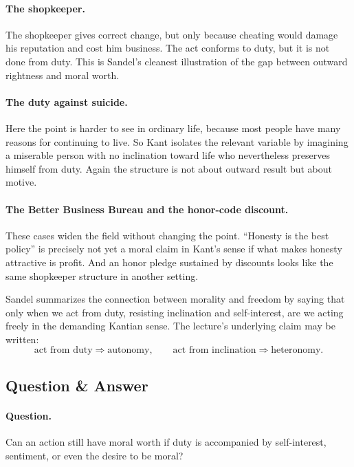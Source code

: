 \paragraph{The shopkeeper.} The shopkeeper gives correct change, but only because cheating would damage his reputation and cost him business. The act conforms to duty, but it is not done from duty. This is Sandel's cleanest illustration of the gap between outward rightness and moral worth.

\paragraph{The duty against suicide.} Here the point is harder to see in ordinary life, because most people have many reasons for continuing to live. So Kant isolates the relevant variable by imagining a miserable person with no inclination toward life who nevertheless preserves himself from duty. Again the structure is not about outward result but about motive.

\paragraph{The Better Business Bureau and the honor-code discount.} These cases widen the field without changing the point. ``Honesty is the best policy'' is precisely not yet a moral claim in Kant's sense if what makes honesty attractive is profit. And an honor pledge sustained by discounts looks like the same shopkeeper structure in another setting.

Sandel summarizes the connection between morality and freedom by saying that only when we act from duty, resisting inclination and self-interest, are we acting freely in the demanding Kantian sense. The lecture's underlying claim may be written:
\begin{equation}
\text{act from duty} \Longrightarrow \text{autonomy},
\qquad
\text{act from inclination} \Longrightarrow \text{heteronomy}.
\end{equation}

\subsection{Question \& Answer}

\paragraph{Question.} Can an action still have moral worth if duty is accompanied by self-interest, sentiment, or even the desire to be moral?

